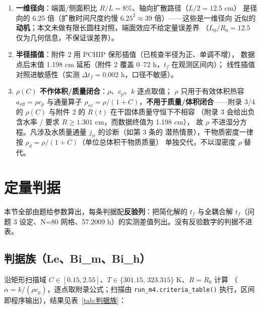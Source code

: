 \documentclass[12pt,a4paper]{ctexart}
\numberwithin{equation}{section}
\begin{document}
\begin{enumerate}
        $\sim5.4$ h（约 $9\%$）；但该情景自身的闭合同样不完备——
        $h_m$ 与能量边界的协调、真实蒸发速率、内部相变份额均需
        材料吸附/解吸关系等题目未给数据才能确定（情景中表面温度一度降至
        $13.4\;^\circ$C、低于湿球温度，正暴露该闭合的不协调），
        故情景值\textbf{不进主交付口径}，主值仍为声明的无潜热基线。
  \item \textbf{一维径向}：端面/侧面积比 $R/L=8\%$、轴向扩散路径（$L/2=12.5$ cm）
        是径向的 6.25 倍（扩散时间尺度约慢 $6.25^2\approx39$ 倍）——这些是一维径向
        近似的\textbf{动机}；本文未做有限长圆柱对照，端面效应不给定量误差界
        （$L_0/R_0=12.5$ 仅为几何信息，不保证误差界）。
  \item \textbf{半径插值}：附件 2 用 PCHIP 保形插值（已核查半径为正、单调不增），
        数据点后末值 1.198 cm 延拓（附件 2 覆盖 0--72 h，$t_f$ 在观测区间内）；
        线性插值对照进敏感性（实测 $\Delta t_f=0.002$ h，口径不敏感）。
  \item \textbf{$\rho(C)$ 不作体积/质量闭合}：$\rho$、$c_p$、$k$ 逐点取值；
        $\rho$ 只用于有效体积热容 $a_{\mathrm{eff}}=\rho c_p$ 与通量算子
        $\rho_{sv}=\rho/(1+C)$，\textbf{不用于质量/体积闭合}——附录 3/4 的
        $\rho(C)$ 与附件 2 的 $R(t)$ 在干固体质量守恒下不相容
        （附录 3 会给出负含水率 / 要求 $R\ge1.301$ cm，而数据终值为 1.198 cm），
        故 $\rho$ 不进湿分方程。凡涉及水质量通量 $j_w$ 的诊断（如第 3 条的
        潜热情景），干物质密度一律按 $\rho_d=\rho/(1+C)$（单位总体积干物质质量）
        单独交代，不以湿密度 $\rho$ 替代。
\end{enumerate}
\section{定量判据}\label{sec:判据}

本节全部由题给参数算出，每条判据配\textbf{反验列}：把简化解的 $t_f$ 与全耦合解
$t_f$（问题 3 设定、N=80 网格、57.2009 h）的实测差值列出。没有反验数字的判据不进表。

\subsection{判据族（Le、Bi\_m、Bi\_h）}
沿矩形扫描域 $C\in[0.15,2.55]$、$T\in\{301.15,\,323.315\}$ K、$R=R_0$ 计算
（$\alpha=k/(\rho c_p)$，逐点取附录公式；扫描由 \texttt{run\_m4.criteria\_table()}
执行，区间即程序输出），结果见表~\ref{tab:判据族}：
\end{document}
